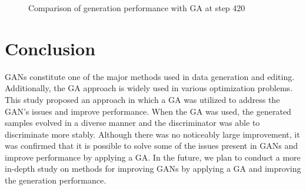 \begin{figure}[t]
\centering
{}
\caption{Comparison of generation performance with GA at step 420}
\label{fig:3}
\end{figure}


\section{Conclusion}
\label{sec:conclusion}
GANs constitute one of the major methods used in data generation and editing. Additionally, the GA approach is widely used in various optimization problems. This study proposed an approach in which a GA was utilized to address the GAN’s issues and improve performance. When the GA was used, the generated samples evolved in a diverse manner and the discriminator was able to discriminate more stably. Although there was no noticeably large improvement, it was confirmed that it is possible to solve some of the issues present in GANs and improve performance by applying a GA. In the future, we plan to conduct a more in-depth study on methods for improving GANs by applying a GA and improving the generation performance.


